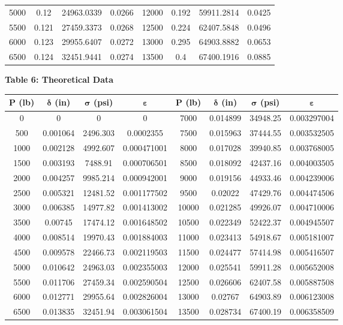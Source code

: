 \documentclass{article}
\begin{document}
\begin{center}
\begin{tabular}{|c c c c || c c c c|}
        5000 & 0.12 & 24963.0339 & 0.0266 &12000 & 0.192 & 59911.2814 & 0.0425 \\ 
        5500 & 0.121 & 27459.3373 & 0.0268 &12500 & 0.224 & 62407.5848 & 0.0496 \\ 
        6000 & 0.123 & 29955.6407 & 0.0272 &13000 & 0.295 & 64903.8882 & 0.0653 \\ 
        6500 & 0.124 & 32451.9441 & 0.0274 &13500 & 0.4 & 67400.1916 & 0.0885 \\ \hline         
    \end{tabular}
    \newpage
    \begin{center}
        \doublespacing
    {\large{\bf Table 6: Theoretical Data\\}}
    \vspace{3mm}
    \begin{tabular}{|c c c c||c c c c|}
        \hline
        \textbf{P (lb)} & \(\bm{\delta}\)\textbf{ (in)} & \(\bm{\sigma}\)\textbf{ (psi)} & \(\bm{\varepsilon}\) & \textbf{P (lb)} & \(\bm{\delta}\)\textbf{ (in)} & \(\bm{\sigma}\)\textbf{ (psi)} & \(\bm{\varepsilon}\) \\ \hline
        0     & 0        & 0        & 0           &7000  & 0.014899 & 34948.25 & 0.003297004 \\
        500   & 0.001064 & 2496.303 & 0.0002355   &7500  & 0.015963 & 37444.55 & 0.003532505 \\
        1000  & 0.002128 & 4992.607 & 0.000471001 &8000  & 0.017028 & 39940.85 & 0.003768005 \\
        1500  & 0.003193 & 7488.91  & 0.000706501 &8500  & 0.018092 & 42437.16 & 0.004003505 \\
        2000  & 0.004257 & 9985.214 & 0.000942001 &9000  & 0.019156 & 44933.46 & 0.004239006 \\
        2500  & 0.005321 & 12481.52 & 0.001177502 &9500  & 0.02022  & 47429.76 & 0.004474506 \\
        3000  & 0.006385 & 14977.82 & 0.001413002 &10000 & 0.021285 & 49926.07 & 0.004710006 \\
        3500  & 0.00745  & 17474.12 & 0.001648502 &10500 & 0.022349 & 52422.37 & 0.004945507 \\
        4000  & 0.008514 & 19970.43 & 0.001884003 &11000 & 0.023413 & 54918.67 & 0.005181007 \\
        4500  & 0.009578 & 22466.73 & 0.002119503 &11500 & 0.024477 & 57414.98 & 0.005416507 \\
        5000  & 0.010642 & 24963.03 & 0.002355003 &12000 & 0.025541 & 59911.28 & 0.005652008 \\
        5500  & 0.011706 & 27459.34 & 0.002590504 &12500 & 0.026606 & 62407.58 & 0.005887508 \\
        6000  & 0.012771 & 29955.64 & 0.002826004 &13000 & 0.02767  & 64903.89 & 0.006123008 \\
        6500  & 0.013835 & 32451.94 & 0.003061504 &13500 & 0.028734 & 67400.19 & 0.006358509 \\\hline
    \end{tabular}
\end{center}
\end{center}
\end{document}
